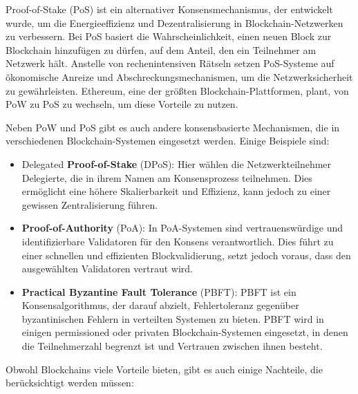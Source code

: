 Proof-of-Stake (PoS) ist ein alternativer Konsensmechanismus, der entwickelt wurde, um die Energieeffizienz und Dezentralisierung in Blockchain-Netzwerken zu verbessern. Bei PoS basiert die Wahrscheinlichkeit, einen neuen Block zur Blockchain hinzufügen zu dürfen, auf dem Anteil, den ein Teilnehmer am Netzwerk hält. Anstelle von rechenintensiven Rätseln setzen PoS-Systeme auf ökonomische Anreize und Abschreckungsmechanismen, um die Netzwerksicherheit zu gewährleisten. Ethereum, eine der größten Blockchain-Plattformen, plant, von PoW zu PoS zu wechseln, um diese Vorteile zu nutzen.

Neben PoW und PoS gibt es auch andere konsensbasierte Mechanismen, die in verschiedenen Blockchain-Systemen eingesetzt werden. Einige Beispiele sind:
\begin{itemize}
\item Delegated \textbf{Proof-of-Stake} (DPoS): Hier wählen die Netzwerkteilnehmer Delegierte, die in ihrem Namen am Konsensprozess teilnehmen. Dies ermöglicht eine höhere Skalierbarkeit und Effizienz, kann jedoch zu einer gewissen Zentralisierung führen.
\item \textbf{Proof-of-Authority} (PoA): In PoA-Systemen sind vertrauenswürdige und identifizierbare Validatoren für den Konsens verantwortlich. Dies führt zu einer schnellen und effizienten Blockvalidierung, setzt jedoch voraus, dass den ausgewählten Validatoren vertraut wird.
\item \textbf{Practical Byzantine Fault Tolerance} (PBFT): PBFT ist ein Konsensalgorithmus, der darauf abzielt, Fehlertoleranz gegenüber byzantinischen Fehlern in verteilten Systemen zu bieten. PBFT wird in einigen permissioned oder privaten Blockchain-Systemen eingesetzt, in denen die Teilnehmerzahl begrenzt ist und Vertrauen zwischen ihnen besteht.
\end{itemize}
Obwohl Blockchains viele Vorteile bieten, gibt es auch einige Nachteile, die berücksichtigt werden müssen:
